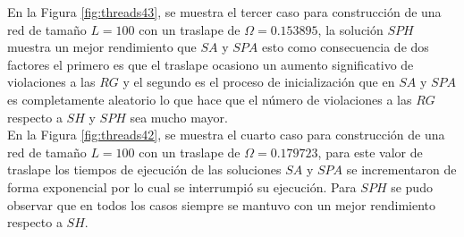 En la Figura \ref{fig:threads43}, se muestra el tercer caso para construcción de una red de tamaño $L=100$ con un traslape de $\Omega=0.153895$, la solución $SPH$ muestra un mejor rendimiento que $SA$ y $SPA$ esto como consecuencia de dos factores el primero es que el traslape ocasiono un aumento significativo de violaciones a las $RG$ y el segundo es el proceso de inicialización que en $SA$ y $SPA$ es completamente aleatorio lo que hace que el número de violaciones a las $RG$ respecto a $SH$ y $SPH$ sea mucho mayor.\\

En la Figura \ref{fig:threads42}, se muestra el cuarto caso para construcción de una red de tamaño $L=100$ con un traslape de $\Omega=0.179723$, para este valor de traslape los tiempos de ejecución de las soluciones $SA$ y $SPA$ se incrementaron de forma exponencial por lo cual se interrumpió su ejecución. Para $SPH$ se pudo observar que en todos los casos siempre se mantuvo con un mejor rendimiento respecto a $SH$.

